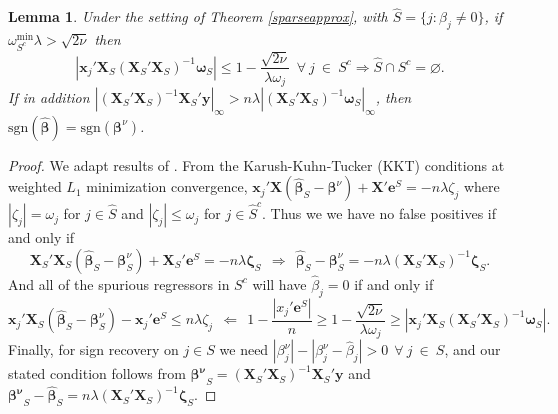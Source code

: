 \documentclass[12pt]{article}
\newtheorem{lemma}{\sc Lemma}[section]
\newcommand{\bs}[1]{\boldsymbol{#1}}
\newcommand{\mr}[1]{\mathrm{#1}}
\newcommand{\bm}[1]{\mathbf{#1}}
\begin{document}
\begin{lemma}\label{signrecov}
Under the setting of Theorem \ref{sparseapprox}, with $\hat S = \{j:\hat\beta_j \neq 0\}$, if $\omega_{S^c}^{\mr{min}}\lambda > \sqrt{2\nu}$ then
\begin{equation}
|\bs{x}_j'\bm{X}_S(\bm{X}_S'\bm{X}_S)^{-1}\bs{\omega}_S| \leq 1 - \frac{\sqrt{2\nu}}{\lambda\omega_j}~~\forall~j ~\in~S^c \Rightarrow \hat{S} \cap S^c = \varnothing.
\end{equation}
 If in addition
$\left|(\bm{X}_S'\bm{X}_S)^{-1}\bm{X}_S'\bm{y}\right|_\infty > n\lambda\left|(\bm{X}_S'\bm{X}_S)^{-1}\bs{\omega}_S\right|_\infty$, then 
$\mr{sgn}(\bs{\hat\beta}) = \mr{sgn}(\bs{\beta}^\nu)$.
\end{lemma}
\begin{proof} We adapt results of \cite{wainwright_sharp_2009}.
From the Karush-Kuhn-Tucker (KKT) conditions at weighted $L_1$ minimization convergence, 
$\bm{x}_j'\bm{X}(\bs{\hat\beta}_S-\bs{\beta}^\nu) + \bm{X}'\bm{e}^S = -n\lambda\zeta_j$ where $|\zeta_j| = \omega_j$ for $j\in\hat S$ and $|\zeta_j| \leq \omega_j$ for $j\in\hat S^c$.
Thus we we have no false positives if and only if
\begin{equation}
\bm{X}_S'\bm{X}_S(\bs{\hat\beta}_S-\bs{\beta}^\nu_S) + \bm{X}_S'\bm{e}^S =-n\lambda\bs{\zeta}_S ~~\Rightarrow~~ \bs{\hat\beta}_S-\bs{\beta}^\nu_S = -n\lambda(\bm{X}_S'\bm{X}_S)^{-1}\bs{\zeta}_S.
\end{equation}
And all of the spurious regressors in $S^c$ will have $\hat \beta_j = 0$
if and only if
\begin{equation}
\bs{x}_j'\bm{X}_S(\bs{\hat\beta}_S-\bs{\beta}^\nu_S) - \bs{x}_j'\bm{e}^S 
\leq n\lambda\zeta_j ~~\Leftarrow~~
1 - \frac{|x_j'\bm{e}^S|}{n} \geq 1 - \frac{\sqrt{2\nu}}{\lambda\omega_j} \geq |\bs{x}_j'\bm{X}_S(\bm{X}_S'\bm{X}_S)^{-1}\bs{\omega}_S|.
\end{equation}
Finally, for sign recovery on $j\in S$ we need 
$
|\beta_j^\nu| - |\beta^\nu_j - \hat\beta_j| > 0 ~~\forall~j~\in~S
$,
and our stated condition follows from  $\bs{\beta^\nu}_S =
(\bm{X}_S'\bm{X}_S)^{-1}\bm{X}_S'\bm{y}$ and $ \bs{\beta^\nu}_S-
\bs{\hat\beta}_S = n\lambda (\bm{X}_S'\bm{X}_S)^{-1}\bs{\zeta}_S$.
\end{proof}

\small


\end{document}
